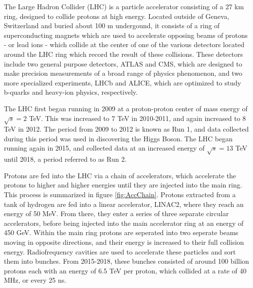 The Large Hadron Collider (LHC) is a particle accelerator consisting of a 27 km ring, designed to collide protons at high energy. Located outside of Geneva, Switzerland and buried about 100 m undergound, it consists of a ring of superconducting magnets which are used to accelerate opposing beams of protons - or lead ions - which collide at the center of one of the various detectors located around the LHC ring which record the result of these collisions. These detectors include two general purpose detectors, ATLAS and CMS, which are designed to make precision measurements of a broad range of physics phenomenon, and two more specialized experiments, LHCb and ALICE, which are optimized to study b-quarks and heavy-ion physics, respectively.

The LHC first began running in 2009 at a proton-proton center of mass energy of $\sqrt{s} = 2$ TeV. This was increased to 7 TeV in 2010-2011, and again increased to 8 TeV in 2012. The period from 2009 to 2012 is known as Run 1, and data collected during this period was used in discovering the Higgs Boson. The LHC began running again in 2015, and collected data at an increased energy of $\sqrt{s} = 13$ TeV until 2018, a period referred to as Run 2. 

Protons are fed into the LHC via a chain of accelerators, which accelerate the protons to higher and higher energies until they are injected into the main ring. This process is summarized in figure \ref{fig:AccChain}. Protons extracted from a tank of hydrogen are fed into a linear accelerator, LINAC2, where they reach an energy of 50 MeV. From there, they enter a series of three separate circular accelerators, before being injected into the main accelerator ring at an energy of 450 GeV. Within the main ring protons are seperated into two seperate beams moving in opposite directions, and their energy is increased to their full collision energy. Radiofrequency cavities are used to accelerate these particles and sort them into bunches. From 2015-2018, these bunches consisted of around 100 billion protons each with an energy of 6.5 TeV per proton, which collided at a rate of 40 MHz, or every 25 ns. 

